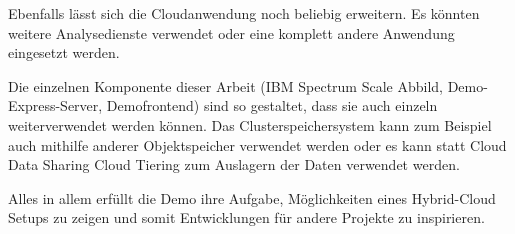 Ebenfalls lässt sich die Cloudanwendung noch beliebig erweitern. Es könnten weitere Analysedienste verwendet oder eine komplett andere Anwendung eingesetzt werden.

Die einzelnen Komponente dieser Arbeit (IBM Spectrum Scale Abbild, Demo-Express-Server, Demofrontend) sind so gestaltet, dass sie auch einzeln weiterverwendet werden können. Das Clusterspeichersystem kann zum Beispiel auch mithilfe anderer Objektspeicher verwendet werden oder es kann statt Cloud Data Sharing Cloud Tiering zum Auslagern der Daten verwendet werden.

Alles in allem erfüllt die Demo ihre Aufgabe, Möglichkeiten eines Hybrid-Cloud Setups zu zeigen und somit Entwicklungen für andere Projekte zu inspirieren. 